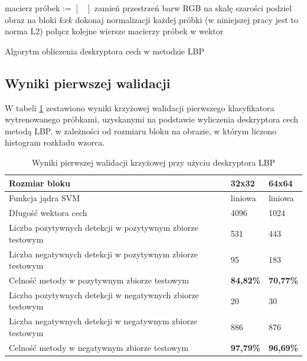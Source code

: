 \begin{algorithm}[H]
 \SetAlgoLined
 macierz próbek := $\left[\begin{array}{ccc}\end{array}\right]$\;
 zamień przestrzeń barw RGB na skalę szarości\;
 podziel obraz na bloki $kxk$\;
 dokonaj normalizacji każdej próbki (w niniejszej pracy jest to norma L2)\;
 połącz kolejne wiersze macierzy próbek w wektor\;
 \;
 \caption{Algorytm obliczenia deskryptora cech w metodzie LBP}
\end{algorithm}

\subsection{Wyniki pierwszej walidacji}

W tabeli \ref{tab:lbp_first} zestawiono wyniki krzyżowej walidacji pierwszego klasyfikatora wytrenowanego 
próbkami, uzyskanymi na podstawie wyliczenia deskryptora cech metodą LBP, w zależności od rozmiaru bloku na obrazie, w którym liczono histogram rozkładu wzorca.

\begin{center}
    \begin{longtable}{ | p{5cm} | p{3cm} | p{3cm}|}
    \caption{Wyniki pierwszej walidacji krzyżowej przy użyciu deskryptora LBP}
    \label{tab:lbp_first}\\
    \hline
	Rozmiar bloku & 32x32 & 64x64 \\ \hline
	Funkcja jądra SVM & liniowa & liniowa \\ \hline
    Długość wektora cech & 4096 & 1024 \\ \hline
    Liczba pozytywnych detekcji w pozytywnym zbiorze testowym & 531 & 443 \\ \hline
    Liczba negatywnych detekcji w pozytywnym zbiorze testowym & 95 & 183 \\ \hline
    Celność metody w pozytywnym zbiorze testowym & \textbf{84,82\%} & \textbf{70,77\%}\\ \hline
    Liczba pozytywnych detekcji w negatywnych zbiorze testowym & 20 & 30 \\ \hline
    Liczba negatywnych detekcji w negatywnym zbiorze testowym & 886 & 876 \\ \hline
    Celność metody w negatywnym zbiorze testowym & \textbf{97,79\%} & \textbf{96,69\%} \\ \hline
    \end{longtable}
\end{center}

